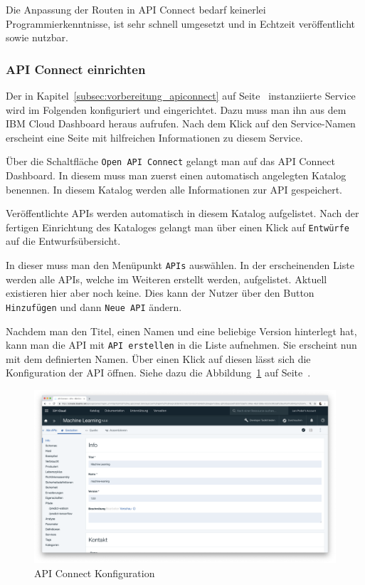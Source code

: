 Die Anpassung der Routen in API Connect bedarf keinerlei Programmierkenntnisse, ist sehr schnell umgesetzt und in
Echtzeit veröffentlicht sowie nutzbar.

\subsubsection{API Connect einrichten}
Der in Kapitel~\ref{subsec:vorbereitung_apiconnect} auf Seite~\pageref{subsec:vorbereitung_apiconnect} instanziierte
Service wird im Folgenden konfiguriert und eingerichtet. Dazu muss man ihn aus dem IBM Cloud Dashboard heraus aufrufen.
Nach dem Klick auf den Service-Namen erscheint eine Seite mit hilfreichen Informationen zu diesem Service.

Über die Schaltfläche \texttt{Open API Connect} gelangt man auf das API Connect Dashboard. In diesem muss man zuerst
einen automatisch angelegten Katalog benennen. In diesem Katalog werden alle Informationen zur API gespeichert.

Veröffentlichte APIs werden automatisch in diesem Katalog aufgelistet. Nach der fertigen Einrichtung des Kataloges
gelangt man über einen Klick auf \texttt{Entwürfe} auf die Entwurfsübersicht.

In dieser muss man den Menüpunkt \texttt{APIs} auswählen. In der erscheinenden Liste werden alle APIs, welche im
Weiteren erstellt werden, aufgelistet. Aktuell existieren hier aber noch keine. Dies kann der Nutzer über den Button
\texttt{Hinzufügen} und dann \texttt{Neue API} ändern.

Nachdem man den Titel, einen Namen und eine beliebige Version hinterlegt hat, kann man die API mit
\texttt{API erstellen} in die Liste aufnehmen. Sie erscheint nun mit dem definierten Namen. Über einen Klick auf diesen
lässt sich die Konfiguration der API öffnen. Siehe dazu die Abbildung~\ref{fig:umsetzung_apiconnect_config} auf
Seite~\pageref{fig:umsetzung_apiconnect_config}.

\begin{figure}[h]
    \centering
    \includegraphics[width=\textwidth]{images/kapitel_3/apiconnect_config.png}
    \caption{API Connect Konfiguration}
    \label{fig:umsetzung_apiconnect_config}
\end{figure}

